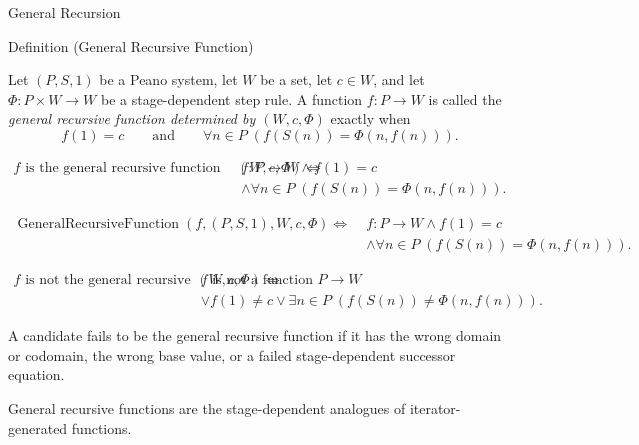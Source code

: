 \begin{topicbox}{General Recursion}
\begin{definitionbox}{Definition (General Recursive Function)}
\begin{definition}
\label{def:general-recursive-function}
Let $(P,S,1)$ be a Peano system, let $W$ be a set, let $c\in W$, and let
$\Phi:P\times W\to W$ be a stage-dependent step rule. A function $f:P\to W$
is called the \emph{general recursive function determined by $(W,c,\Phi)$}
exactly when
\[
f(1)=c
\qquad\text{and}\qquad
\forall n\in P\;(f(S(n))=\Phi(n,f(n))).
\]
\end{definition}
\end{definitionbox}

\begin{remark*}
\[
\begin{aligned}
f \text{ is the general recursive function determined by } (W,c,\Phi)
\Longleftrightarrow\;&
f:P\to W\land f(1)=c\\
&\land \forall n\in P\;(f(S(n))=\Phi(n,f(n))).
\end{aligned}
\]
\end{remark*}

\begin{remark*}
\[
\begin{aligned}
\operatorname{GeneralRecursiveFunction}(f,(P,S,1),W,c,\Phi)
\Longleftrightarrow\;&
f:P\to W\land f(1)=c\\
&\land \forall n\in P\;(f(S(n))=\Phi(n,f(n))).
\end{aligned}
\]
\end{remark*}

\begin{remark*}
\[
\begin{aligned}
f \text{ is not the general recursive function determined by } (W,c,\Phi)
\Longleftrightarrow\;&
f \text{ is not a function } P\to W\\
&\lor f(1)\neq c
\lor \exists n\in P\;(f(S(n))\neq \Phi(n,f(n))).
\end{aligned}
\]
\end{remark*}

\begin{remark*}
A candidate fails to be the general recursive function if it has the wrong
domain or codomain, the wrong base value, or a failed stage-dependent
successor equation.
\end{remark*}

\begin{remark*}[Interpretation]
General recursive functions are the stage-dependent analogues of
iterator-generated functions.
\end{remark*}


\end{topicbox}
